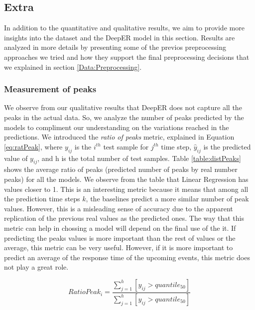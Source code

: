 

\subsection{Extra}

In addition to the quantitative and qualitative results, we aim to provide more insights into the dataset and the DeepER model in this section. Results are analyzed in more details by presenting some of the previos preprocessing approaches we tried and how they support the final preprocessing decisions that we explained in section \ref{Data:Preprocessing}.



\subsubsection{Measurement of peaks}

We observe from our qualitative results that DeepER does not capture all the peaks in the actual data. So, we analyze the number of peaks predicted by the models to compliment our understanding on the variations reached in the predictions. We introduced the \textit{ratio of peaks} metric, explained in Equation \ref{eq:ratPeak}, where $y_{ij}$ is the $i^{th}$ test sample for $j^{th}$ time step, $\hat{y}_{ij}$ is the predicted value of $y_{ij}$, and h is the total number of test samples. Table \ref{table:distPeaks} shows the average ratio of peaks (predicted number of peaks by real number peaks) for all the models. We observe from the table that Linear Regression has values closer to 1. This is an interesting metric because it means that among all the prediction time steps $k$, the baselines predict a more similar number of peak values. However, this is a misleading sense of accuracy due to the apparent replication of the previous real values as the predicted ones. The way that this metric can help in chossing a model will depend on the final use of the it. If predicting the peaks values is more important than the rest of values or the average, this metric can be very useful. However, if it is more important to predict an average of the response time of the upcoming events, this metric does not play a great role.

\begin{equation} 
	\label{eq:ratPeak}
	RatioPeak_{i} = \frac{\sum_{j=1}^{h}{[\hat{y}_{ij} > quantile_{50}]}}{\sum_{j=1}^{h}{[{y}_{ij} > quantile_{50}]}}
\end{equation}
\vspace{3mm}

